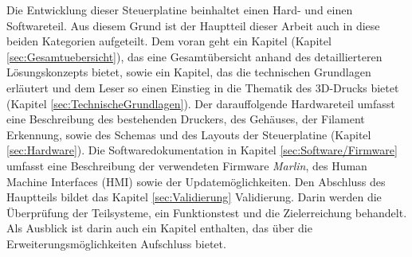Die Entwicklung dieser Steuerplatine beinhaltet einen Hard- und einen Softwareteil. Aus diesem Grund ist der Hauptteil dieser Arbeit auch in diese beiden Kategorien aufgeteilt. Dem voran geht ein Kapitel (Kapitel \ref{sec:Gesamtuebersicht}), das eine Gesamtübersicht anhand des detaillierteren Lösungskonzepts bietet, sowie ein Kapitel, das die technischen Grundlagen erläutert und dem Leser so einen Einstieg in die Thematik des 3D-Drucks bietet (Kapitel \ref{sec:TechnischeGrundlagen}). Der darauffolgende Hardwareteil umfasst eine Beschreibung des bestehenden Druckers, des Gehäuses, der Filament Erkennung, sowie des Schemas und des Layouts der Steuerplatine (Kapitel \ref{sec:Hardware}). Die Softwaredokumentation in Kapitel \ref{sec:Software/Firmware}  umfasst eine Beschreibung der verwendeten Firmware \textit{Marlin}, des Human Machine Interfaces (HMI) sowie der Updatemöglichkeiten.
Den Abschluss des Hauptteils bildet das Kapitel \ref{sec:Validierung} Validierung. Darin werden die Überprüfung der Teilsysteme, ein Funktionstest und die Zielerreichung behandelt. Als Ausblick ist darin auch ein Kapitel enthalten, das über die Erweiterungsmöglichkeiten Aufschluss bietet.



